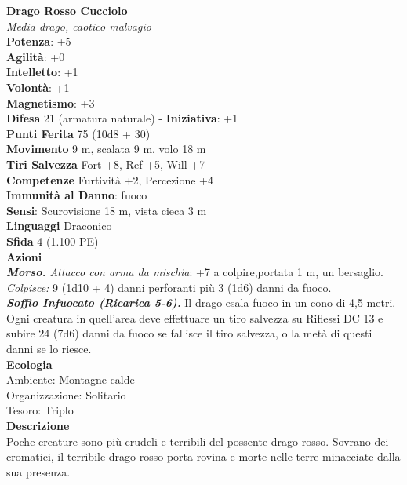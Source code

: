 \begin{multicols}{2}
\medskip\textbf{Drago Rosso Cucciolo}\\
\emph{Media drago, caotico malvagio}\\
\textbf{Potenza}: +5\\
\textbf{Agilità}: +0\\
\textbf{Intelletto}: +1\\
\textbf{Volontà}: +1\\
\textbf{Magnetismo}: +3\\
\textbf{Difesa} 21 (armatura naturale) - \textbf{Iniziativa}: +1\\
\textbf{Punti Ferita} 75 (10d8 + 30)\\
\textbf{Movimento} 9 m, scalata 9 m, volo 18 m\\
\textbf{Tiri Salvezza} Fort +8, Ref +5, Will +7\\
\textbf{Competenze} Furtività +2, Percezione +4\\
\textbf{Immunità al Danno}: fuoco\\
\textbf{Sensi}: Scurovisione 18 m, vista cieca 3 m\\
\textbf{Linguaggi} Draconico\\
\textbf{Sfida} 4 (1.100 PE)\smallskip\\
\smallskip\textbf{Azioni}\\
\emph{\textbf{Morso.} Attacco con arma da mischia}: +7 a colpire,portata 1 m, un bersaglio. \\
\emph{Colpisce:} 9 (1d10 + 4) danni perforanti più 3 (1d6) danni da fuoco.\\
\emph{\textbf{Soffio Infuocato (Ricarica 5-6).}} Il drago esala fuoco in un cono di 4,5 metri. Ogni creatura in quell'area deve effettuare un tiro salvezza su Riflessi DC 13 e subire 24 (7d6) danni da fuoco se fallisce il tiro salvezza, o la metà di questi danni se lo riesce.\\
\textbf{Ecologia}\\
Ambiente: Montagne calde\\
Organizzazione: Solitario\\
Tesoro: Triplo\\
\textbf{Descrizione}\\
Poche creature sono più crudeli e terribili del possente drago rosso. Sovrano dei cromatici, il terribile drago rosso porta rovina e morte nelle terre minacciate dalla sua presenza.\\


\end{multicols}
